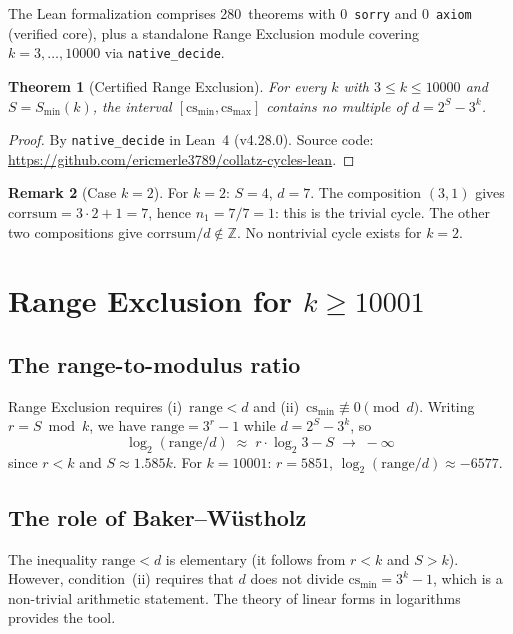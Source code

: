 \documentclass[11pt,a4paper]{article}
\theoremstyle{plain}
\newtheorem{theorem}{Theorem}[section]
\theoremstyle{definition}
\newtheorem{remark}[theorem]{Remark}
\newcommand{\Z}{\mathbb{Z}}
\newcommand{\corr}{\mathrm{corrsum}}
\begin{document}
The Lean formalization comprises 280~theorems with 0~\texttt{sorry} and 0~\texttt{axiom} (verified core), plus a standalone Range Exclusion module covering $k = 3, \ldots, 10000$ via \texttt{native\_decide}.

\begin{theorem}[Certified Range Exclusion]\label{thm:certified}
For every $k$ with $3 \leq k \leq 10000$ and $S = S_{\min}(k)$, the interval $[\mathrm{cs_{min}}, \mathrm{cs_{max}}]$ contains no multiple of $d = 2^S - 3^k$.
\end{theorem}

\begin{proof}
By \texttt{native\_decide} in Lean~4 (v4.28.0). Source code:
\url{https://github.com/ericmerle3789/collatz-cycles-lean}.
\end{proof}

\begin{remark}[Case $k = 2$]
For $k = 2$: $S = 4$, $d = 7$. The composition $(3,1)$ gives $\corr = 3 \cdot 2 + 1 = 7$, hence $n_1 = 7/7 = 1$: this is the trivial cycle. The other two compositions give $\corr/d \notin \Z$. No nontrivial cycle exists for $k = 2$.
\end{remark}

\section{Range Exclusion for $k \geq 10001$}

\subsection{The range-to-modulus ratio}

Range Exclusion requires (i)~$\mathrm{range} < d$ and (ii)~$\mathrm{cs_{min}} \not\equiv 0 \pmod{d}$. Writing $r = S \bmod k$, we have $\mathrm{range} = 3^r - 1$ while $d = 2^S - 3^k$, so
\[
\log_2(\mathrm{range}/d) \;\approx\; r \cdot \log_2 3 - S \;\to\; -\infty
\]
since $r < k$ and $S \approx 1.585k$. For $k = 10001$: $r = 5851$, $\log_2(\mathrm{range}/d) \approx -6577$.

\subsection{The role of Baker--W\"ustholz}

The inequality $\mathrm{range} < d$ is elementary (it follows from $r < k$ and $S > k$). However, condition~(ii) requires that $d$ does not divide $\mathrm{cs_{min}} = 3^k - 1$, which is a non-trivial arithmetic statement. The theory of linear forms in logarithms provides the tool.
\end{document}
